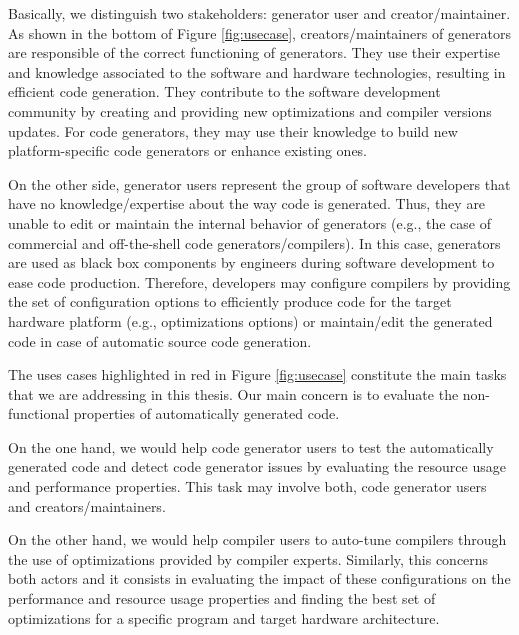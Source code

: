 Basically, we distinguish two stakeholders: generator user and creator/maintainer. As shown in the bottom of Figure \ref{fig:usecase}, creators/maintainers of generators are responsible of the correct functioning of generators. They use their expertise and knowledge associated to the software and hardware technologies, resulting in efficient code generation. They contribute to the software development community by creating and providing new optimizations and compiler versions updates. For code generators, they may use their knowledge to build new platform-specific code generators or enhance existing ones. 

On the other side, generator users represent the group of software developers that have no knowledge/expertise about the way code is generated. Thus, they are unable to edit or maintain the internal behavior of generators (e.g., the case of commercial and off-the-shell code generators/compilers). In this case, generators are used as black box components by engineers during software development to ease code production. Therefore, developers may configure compilers by providing the set of configuration options to efficiently produce code for the target hardware platform (e.g., optimizations options) or maintain/edit the generated code in case of automatic source code generation.

The uses cases highlighted in red in Figure \ref{fig:usecase} constitute the main tasks that we are addressing in this thesis. Our main concern is to evaluate the non-functional properties of automatically generated code.

On the one hand, we would help code generator users to test the automatically generated code and detect code generator issues by evaluating the resource usage and performance properties. This task may involve both, code generator users and creators/maintainers.

On the other hand, we would help compiler users to auto-tune compilers through the use of optimizations provided by compiler experts. Similarly, this concerns both actors and it consists in evaluating the impact of these configurations on the performance and resource usage properties and finding the best set of optimizations for a specific program and target hardware architecture.


